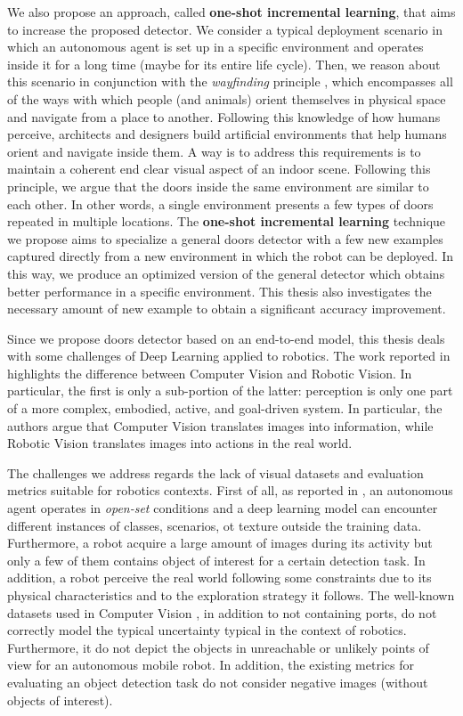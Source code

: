 We also propose an approach, called \textbf{one-shot incremental learning}, that aims to increase the proposed detector. We consider a typical deployment scenario in which an autonomous agent is set up in a specific environment and operates inside it for a long time (maybe for its entire life cycle). Then, we reason about this scenario in  conjunction with the \textit{wayfinding} principle \cite{wayfinding, imageofcity}, which encompasses all of the ways with which people (and animals) orient themselves in physical space and navigate from a place to another. Following this knowledge of how humans perceive, architects and designers build artificial environments that help humans orient and navigate inside them. A way is to address this requirements is to maintain a coherent end clear visual aspect of an indoor scene. Following this principle, we argue that the doors inside the same environment are similar to each other. In other words, a single environment presents a few types of doors repeated in multiple locations.  The \textbf{one-shot incremental learning} technique we propose aims to specialize a general doors detector with a few new examples captured directly from a new environment in which the robot can be deployed. In this way, we produce an optimized version of the general detector which obtains better performance in a specific environment. This thesis also investigates the necessary amount of new example to obtain a significant accuracy improvement.

Since we propose doors detector based on an end-to-end model, this thesis deals with some challenges of Deep Learning applied to robotics. The work reported in \cite{surveydeeplimits} highlights the difference between Computer Vision and Robotic Vision. In particular, the first is only a sub-portion of the latter: perception is only one part of a more complex, embodied, active, and goal-driven system. In particular, the authors argue that Computer Vision translates images into information, while Robotic Vision translates images into actions in the real world.

The challenges we address regards the lack of visual datasets and evaluation metrics suitable for robotics contexts. First of all, as reported in \cite{surveydeeplimits}, an autonomous agent operates in \textit{open-set} conditions and a deep learning model can encounter different instances of classes, scenarios, ot texture outside the training data. Furthermore, a robot acquire a large amount of images during its activity but only a few of them contains object of interest for a certain detection task. In addition, a robot perceive the real world following some constraints due to its physical characteristics and to the exploration strategy it follows. The well-known datasets used in Computer Vision \cite{coco, imagenet, pascal}, in addition to not containing ports, do not correctly model the typical uncertainty typical in the context of robotics. Furthermore, it do not depict the objects in unreachable or unlikely points of view for an autonomous mobile robot. In addition, the existing metrics for evaluating an object detection task \cite{pascal, generalizediou, coco} do not consider negative images (without objects of interest). 
